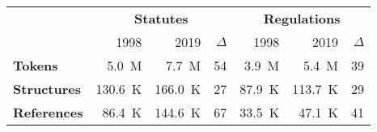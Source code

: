 \begin{tabular}{lrrrrrr}
\toprule & \multicolumn{3}{c}{\textbf{Statutes}} & \multicolumn{3}{c}{\textbf{Regulations}} \\
            & 1998   & 2019   &   $\Delta$ & 1998   & 2019   &   $\Delta$ \\
\midrule
 \textbf{Tokens}     & 5.0~M                & 7.7~M                &                      54 & 3.9~M                   & 5.4~M                   &                         39 \\
 \textbf{Structures} & 130.6~K              & 166.0~K              &                      27 & 87.9~K                  & 113.7~K                 &                         29 \\
 \textbf{References} & 86.4~K               & 144.6~K              &                      67 & 33.5~K                  & 47.1~K                  &                         41 \\
\bottomrule
\end{tabular}